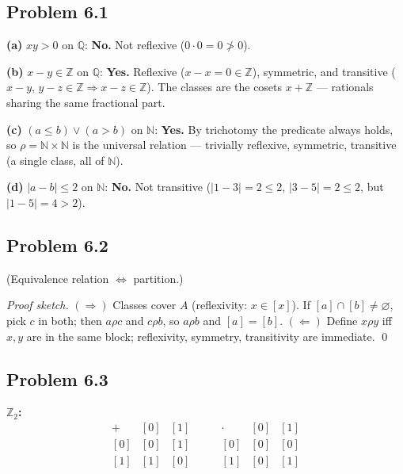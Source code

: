 \subsection*{Problem 6.1}

\textbf{(a)} $xy>0$ on $\mathbb{Q}$: \textbf{No.} Not reflexive ($0\cdot 0=0\not>0$).

\textbf{(b)} $x-y\in\mathbb{Z}$ on $\mathbb{Q}$: \textbf{Yes.} Reflexive ($x-x=0\in\mathbb{Z}$), symmetric, and transitive ($x-y,\,y-z\in\mathbb{Z}\Rightarrow x-z\in\mathbb{Z}$). The classes are the cosets $x+\mathbb{Z}$ --- rationals sharing the same fractional part.

\textbf{(c)} $(a\le b)\lor(a>b)$ on $\mathbb{N}$: \textbf{Yes.} By trichotomy the predicate always holds, so $\rho=\mathbb{N}\times\mathbb{N}$ is the universal relation --- trivially reflexive, symmetric, transitive (a single class, all of $\mathbb{N}$).

\textbf{(d)} $|a-b|\le 2$ on $\mathbb{N}$: \textbf{No.} Not transitive ($|1-3|=2\le 2$, $|3-5|=2\le 2$, but $|1-5|=4>2$).


\subsection*{Problem 6.2}

(Equivalence relation $\Leftrightarrow$ partition.)

\emph{Proof sketch.}
$(\Rightarrow)$ Classes cover $A$ (reflexivity: $x\in[x]$). If $[a]\cap[b]\ne\varnothing$, pick $c$ in both; then $a\rho c$ and $c\rho b$, so $a\rho b$ and $[a]=[b]$.
$(\Leftarrow)$ Define $x\rho y$ iff $x,y$ are in the same block; reflexivity, symmetry, transitivity are immediate. \qed


\subsection*{Problem 6.3}

\textbf{$\mathbb{Z}_2$:}
\[
\begin{array}{c|cc}
+ & [0] & [1] \\\hline
{[0]} & [0] & [1] \\
{[1]} & [1] & [0]
\end{array}
\qquad
\begin{array}{c|cc}
\cdot & [0] & [1] \\\hline
{[0]} & [0] & [0] \\
{[1]} & [0] & [1]
\end{array}
\]

